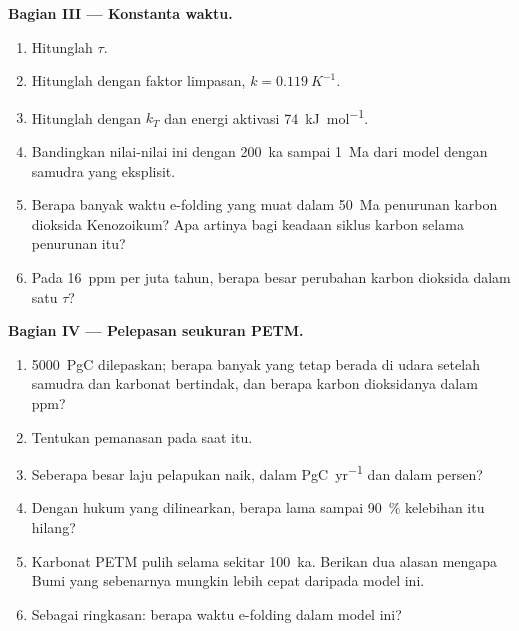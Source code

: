 \begin{problem}
\noindent\textbf{Bagian III --- Konstanta waktu.}
\begin{enumerate}[resume]
  \item Hitunglah $\tau$.
  \item Hitunglah dengan faktor limpasan, $k = \qty{0.119}{K^{-1}}$.
  \item Hitunglah dengan $k_T$ dan energi aktivasi \qty{74}{kJ.mol^{-1}}.
  \item Bandingkan nilai-nilai ini dengan \qty{200}{ka} sampai \qty{1}{Ma} dari model dengan samudra yang eksplisit.
  \item Berapa banyak waktu e-folding yang muat dalam \qty{50}{Ma} penurunan karbon
        dioksida Kenozoikum? Apa artinya bagi keadaan siklus karbon selama penurunan itu?
  \item Pada \qty{16}{ppm} per juta tahun, berapa besar perubahan karbon dioksida dalam satu $\tau$?
\end{enumerate}

\noindent\textbf{Bagian IV --- Pelepasan seukuran PETM.}
\begin{enumerate}[resume]
  \item \qty{5000}{PgC} dilepaskan; berapa banyak yang tetap berada di udara setelah samudra dan karbonat
        bertindak, dan berapa karbon dioksidanya dalam ppm?
  \item Tentukan pemanasan pada saat itu.
  \item Seberapa besar laju pelapukan naik, dalam \unit{PgC.yr^{-1}} dan dalam persen?
  \item Dengan hukum yang dilinearkan, berapa lama sampai \qty{90}{\percent} kelebihan itu hilang?
  \item Karbonat PETM pulih selama sekitar \qty{100}{ka}. Berikan dua alasan mengapa Bumi yang sebenarnya
        mungkin lebih cepat daripada model ini.
  \item Sebagai ringkasan: berapa waktu e-folding  dalam model ini?
\end{enumerate}
\end{problem}
